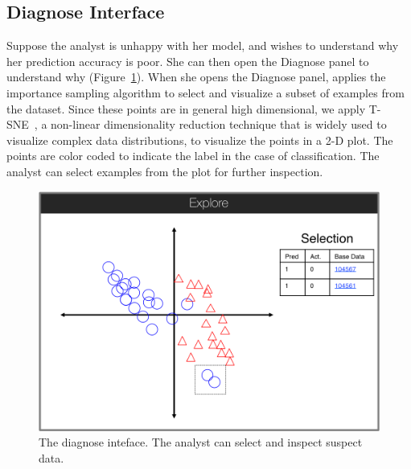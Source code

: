 \subsection{Diagnose Interface}
Suppose the analyst is unhappy with her model, and wishes to understand why her prediction accuracy is poor.
She can then open the \textsf{Diagnose} panel to understand why (Figure~\ref{diag}).
When she opens the \textsf{Diagnose} panel, \sys applies the importance sampling algorithm  to select and visualize a subset of examples from the dataset.
Since these points are in general high dimensional, we apply T-SNE~\cite{van2008visualizing},
a non-linear dimensionality reduction technique that is widely used to visualize complex data distributions,
to visualize the points in a 2-D plot.
The points are color coded to indicate the label in the case of classification.
The analyst can select examples from the plot for further inspection.

\begin{figure}[t]
\centering
 \includegraphics[width=0.6\columnwidth]{figs/interface3.png}
 \caption{The diagnose inteface. The analyst can select and inspect suspect data. \label{diag}}
\end{figure}

